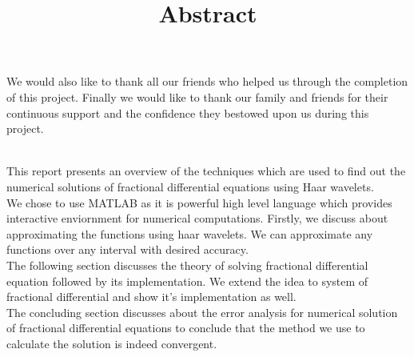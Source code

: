 \documentclass[12pt]{article}
\begin{document}
We would also like to thank all our friends who helped us through the completion of this project. Finally we would like to thank our family and friends for their continuous support and the confidence they bestowed upon us during this project.

\newpage
\hspace{3.5cm}\title{\textbf{\huge{Abstract}}} \vspace{0.5cm} \\
This report presents an overview of the techniques which are used to find out the numerical solutions of fractional differential equations using Haar wavelets. \vspace{0.4cm} \\ 
 We chose to use MATLAB as it is powerful high level language which provides interactive enviornment for numerical computations. Firstly, we discuss about approximating the functions using haar wavelets. We can approximate any functions over any interval with desired accuracy.
\vspace{0.4cm} \\
The following section discusses the theory of solving fractional differential equation followed by its implementation. We extend the idea to system of fractional differential and show it's implementation as well.  \vspace{0.4cm} \\
The concluding section discusses about the error analysis for numerical solution of fractional differential equations to conclude that the method we use to calculate the solution is indeed convergent.
\newpage

\newpage

\newpage

\end{document}
